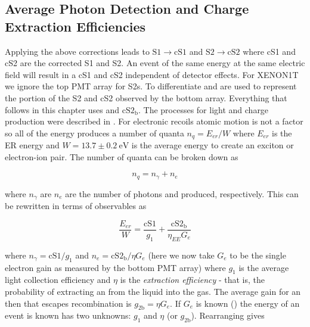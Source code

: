 \subsection{Average Photon Detection and Charge Extraction Efficiencies}
\label{subsec:det_char_photon_charge_efficiencies}
Applying the above corrections leads to $\mathrm{S1} \rightarrow \mathrm{cS1}$ and $\mathrm{S2} \rightarrow \mathrm{cS2}$ where cS1 and
cS2 are the corrected S1 and S2.  An event of the same energy at the same electric field will result in a cS1 and cS2 independent of
detector effects.  For XENON1T we ignore the top PMT array for S2s.  To differentiate \stwob and \cstwob are used to represent the portion
of the S2 and cS2 observed by the bottom array.  Everything that follows in this chapter uses \stwob and $\mathrm{cS2_b}$.  The processes
for light and charge production were described in .  For electronic recoils atomic motion is
not a factor so all of the energy produces a number of quanta $n_q = E_{er} / W$ where $E_{er}$ is the ER energy and
$W = 13.7 \pm 0.2\ \mathrm{eV}$ is the average energy to create an exciton or electron-ion pair.  The number of quanta can be broken
down as

\begin{equation}
n_q = n_{\gamma} + n_e
\end{equation}

\noindent where $n_{\gamma}$ are $n_e$ are the number of photons and \electron produced, respectively.  This can be rewritten in terms of
observables as

\begin{equation}
\frac{E_{er}}{W} = \frac{\mathrm{cS1}}{g_1} + \frac{\mathrm{cS2_b}}{\eta_{EE} G_e}
\label{eq:calibrations_s1_s2}
\end{equation}

\noindent where $n_{\gamma} = \mathrm{cS1} / g_1$ and $n_e = \mathrm{cS2_b} / \eta G_e$ (here we now take $G_e$ to be the single electron
gain as measured by the bottom PMT array) where $g_1$ is the average light collection
efficiency and $\eta$
is the \textit{extraction efficiency} - that is, the probability of extracting an \electron from the liquid into the gas.  The average
gain for an \electron then that escapes recombination is $g_{2 \mathrm{b}} = \eta G_e$.  If $G_e$ is known
() the energy of an event is known  has two unknowns:
$g_1$ and $\eta$ (or $g_{2 \mathrm{b}}$).  Rearranging gives

